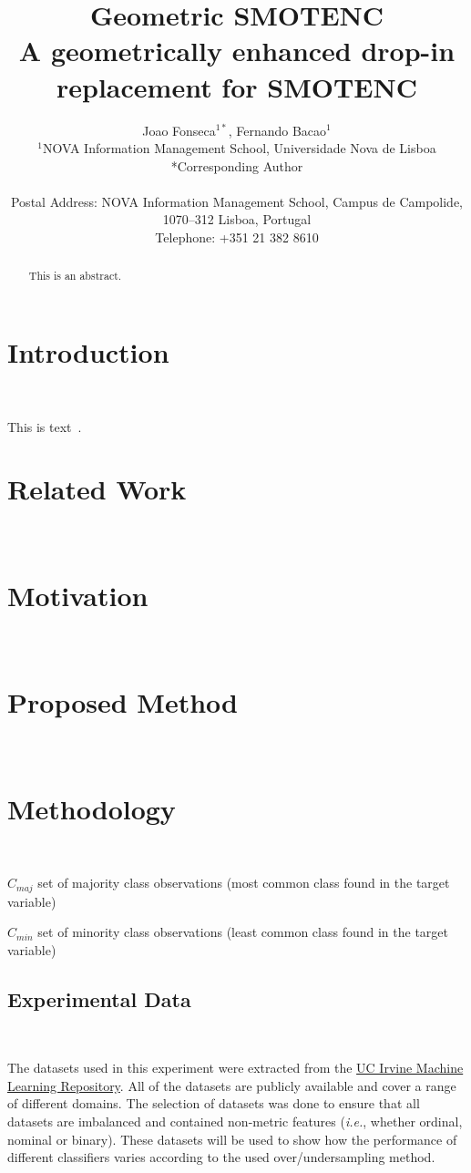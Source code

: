 \documentclass[parskip=full]{scrartcl}
\title{Geometric SMOTENC \\ \LARGE{A geometrically enhanced drop-in
replacement for SMOTENC}}
\author{%
	Joao Fonseca\(^{1*}\), Fernando Bacao\(^{1}\)
	\\
	\small{\(^{1}\)NOVA Information Management School, Universidade Nova de Lisboa}
	\\
	\small{*Corresponding Author}
	\\
	\\
	\small{Postal Address: NOVA Information Management School, Campus de
    Campolide, 1070--312 Lisboa, Portugal}
	\\
	\small{Telephone: +351 21 382 8610}
}
\date{}
\begin{document}
\maketitle

\begin{abstract}
    This is an abstract.
\end{abstract}

\section{Introduction}~\label{sec:introduction}

This is text~\cite{Chawla2002}.

\section{Related Work}~\label{sec:related_work}

\section{Motivation}~\label{sec:motivation}

\section{Proposed Method}~\label{sec:proposed_method}

\section{Methodology}~\label{sec:methodology}

$C_{maj}$ set of majority class observations (most common class found in the
target variable)

$C_{min}$ set of minority class observations (least common class found in the
target variable)

\subsection{Experimental Data}~\label{sec:experimental_data}

The datasets used in this experiment were extracted from the
\href{https://archive.ics.uci.edu}{UC Irvine Machine Learning Repository}. All
of the datasets are publicly available and cover a range of different domains.
The selection of datasets was done to ensure that all datasets are imbalanced
and contained non-metric features (\textit{i.e.}, whether ordinal, nominal or
binary). These datasets will be used to show how the performance of different
classifiers varies according to the used over/undersampling method.
\end{document}
